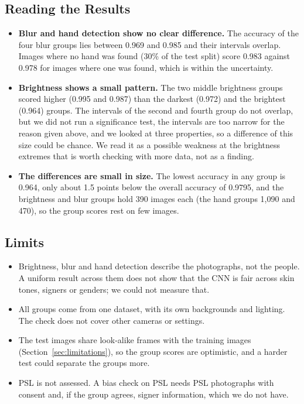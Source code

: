 \subsection{Reading the Results}
\begin{itemize}
  \item \textbf{Blur and hand detection show no clear difference.} The accuracy of the four blur groups lies between 0.969 and 0.985 and their intervals overlap. Images where no hand was found (30\% of the test split) score 0.983 against 0.978 for images where one was found, which is within the uncertainty.
  \item \textbf{Brightness shows a small pattern.} The two middle brightness groups scored higher (0.995 and 0.987) than the darkest (0.972) and the brightest (0.964) groups. The intervals of the second and fourth group do not overlap, but we did not run a significance test, the intervals are too narrow for the reason given above, and we looked at three properties, so a difference of this size could be chance. We read it as a possible weakness at the brightness extremes that is worth checking with more data, not as a finding.
  \item \textbf{The differences are small in size.} The lowest accuracy in any group is 0.964, only about 1.5 points below the overall accuracy of 0.9795, and the brightness and blur groups hold 390 images each (the hand groups 1{,}090 and 470), so the group scores rest on few images.
\end{itemize}

\subsection{Limits}
\begin{itemize}
  \item Brightness, blur and hand detection describe the photographs, not the people. A uniform result across them does not show that the CNN is fair across skin tones, signers or genders; we could not measure that.
  \item All groups come from one dataset, with its own backgrounds and lighting. The check does not cover other cameras or settings.
  \item The test images share look-alike frames with the training images (Section~\ref{sec:limitations}), so the group scores are optimistic, and a harder test could separate the groups more.
  \item PSL is not assessed. A bias check on PSL needs PSL photographs with consent and, if the group agrees, signer information, which we do not have.
\end{itemize}
